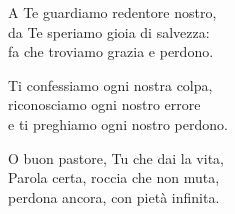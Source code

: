 

\spazio

\strofa A Te guardiamo redentore nostro,\\
da Te speriamo gioia di salvezza:\\
fa che troviamo grazia e perdono.

\spazio


\spazio

\strofa Ti confessiamo ogni nostra colpa,\\
riconosciamo ogni nostro errore\\
e ti preghiamo ogni nostro perdono.

\spazio


\spazio

\strofa O buon pastore, Tu che dai la vita,\\
Parola certa, roccia che non muta,\\
perdona ancora, con pietà infinita.

\spazio

